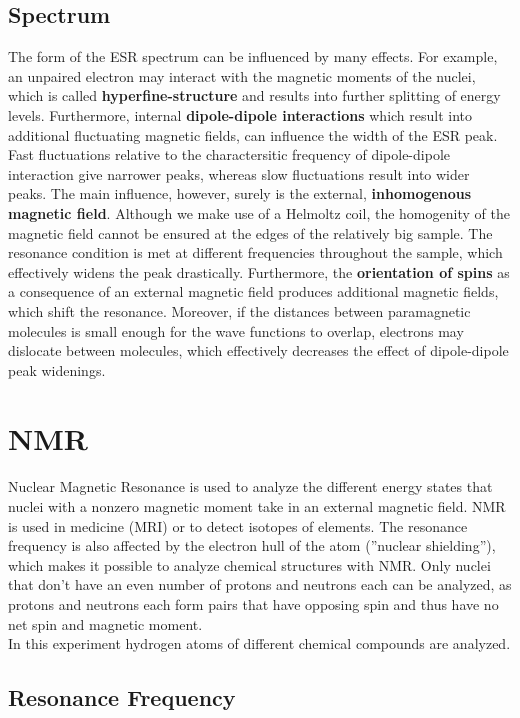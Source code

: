 \subsection{Spectrum}
The form of the ESR spectrum can be influenced by many effects.
For example, an unpaired electron may interact with the magnetic moments of the nuclei, which is called \textbf{hyperfine-structure} and results into further splitting of energy levels.
Furthermore, internal \textbf{dipole-dipole interactions} which result into additional fluctuating magnetic fields, can influence the width of the ESR peak.
Fast fluctuations relative to the charactersitic frequency of dipole-dipole interaction give narrower peaks, whereas slow fluctuations result into wider peaks.
The main influence, however, surely is the external, \textbf{inhomogenous magnetic field}.
Although we make use of a Helmoltz coil, the homogenity of the magnetic field cannot be ensured at the edges of the relatively big sample.
The resonance condition is met at different frequencies throughout the sample, which effectively widens the peak drastically.
Furthermore, the \textbf{orientation of spins} as a consequence of an external magnetic field produces additional magnetic fields, which shift the resonance.
Moreover, if the distances between paramagnetic molecules is small enough for the wave functions to overlap, electrons may dislocate between molecules, which effectively decreases the effect of dipole-dipole peak widenings.

\section{NMR}
Nuclear Magnetic Resonance is used to analyze the different energy states that nuclei with a nonzero magnetic moment take in an external magnetic field.
NMR is used in medicine (MRI) or to detect isotopes of elements.
The resonance frequency is also affected by the electron hull of the atom (''nuclear shielding''), which makes it possible to analyze chemical structures with NMR.
Only nuclei that don't have an even number of protons and neutrons each can be analyzed, as protons and neutrons each form pairs that have opposing spin and thus have no net spin and magnetic moment.\\
In this experiment hydrogen atoms of different chemical compounds are analyzed.

\subsection{Resonance Frequency}

